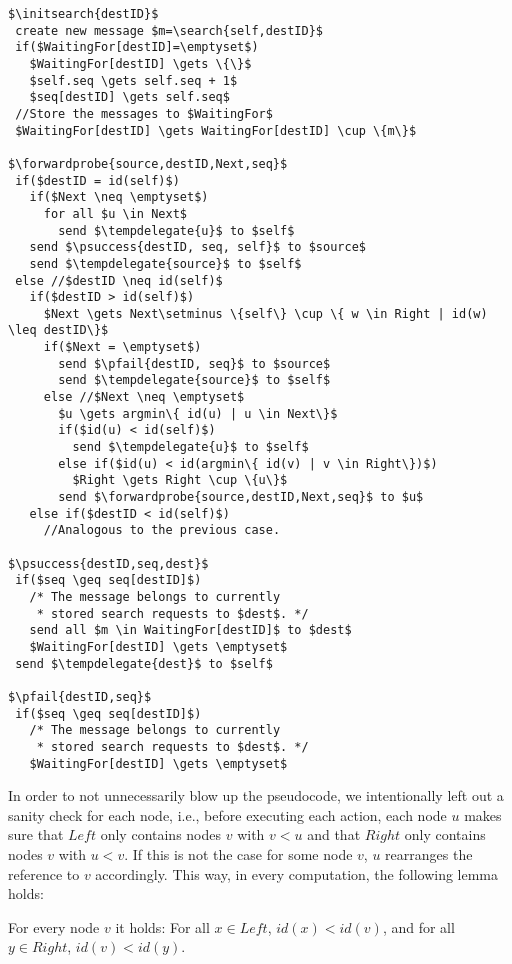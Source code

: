 \documentclass[a4paper,USenglish]{lipics}
\newcommand{\srp}{\textsc{Search+}\xspace}
\newcommand{\tempdelegate}[1]{\textsc{TempDelegate(\ensuremath{#1})}\xspace}
\newcommand{\search}[1]{\textsc{Search(\ensuremath{#1})}\xspace}
\newcommand{\initsearch}[1]{\textsc{InitiateNewSearch(\ensuremath{#1})}\xspace}
\newcommand{\forwardprobe}[1]{\textsc{ForwardProbe(\ensuremath{#1})}\xspace}
\newcommand{\psuccess}[1]{\textsc{ProbeSuccess(\ensuremath{#1})}\xspace}
\newcommand{\pfail}[1]{\textsc{ProbeFail(\ensuremath{#1})}\xspace}
\begin{document}
\begin{lstlisting}[mathescape=true,float,caption=\srp protocol,label=algo:search]
$\initsearch{destID}$
 create new message $m=\search{self,destID}$
 if($WaitingFor[destID]=\emptyset$)
   $WaitingFor[destID] \gets \{\}$
   $self.seq \gets self.seq + 1$
   $seq[destID] \gets self.seq$
 //Store the messages to $WaitingFor$ 
 $WaitingFor[destID] \gets WaitingFor[destID] \cup \{m\}$ 

$\forwardprobe{source,destID,Next,seq}$
 if($destID = id(self)$)
   if($Next \neq \emptyset$)
     for all $u \in Next$
       send $\tempdelegate{u}$ to $self$
   send $\psuccess{destID, seq, self}$ to $source$
   send $\tempdelegate{source}$ to $self$
 else //$destID \neq id(self)$
   if($destID > id(self)$)
     $Next \gets Next\setminus \{self\} \cup \{ w \in Right | id(w) \leq destID\}$
     if($Next = \emptyset$)
       send $\pfail{destID, seq}$ to $source$
       send $\tempdelegate{source}$ to $self$
     else //$Next \neq \emptyset$
       $u \gets argmin\{ id(u) | u \in Next\}$
       if($id(u) < id(self)$)
         send $\tempdelegate{u}$ to $self$
       else if($id(u) < id(argmin\{ id(v) | v \in Right\})$)
         $Right \gets Right \cup \{u\}$
       send $\forwardprobe{source,destID,Next,seq}$ to $u$
   else if($destID < id(self)$) 
     //Analogous to the previous case.
 
$\psuccess{destID,seq,dest}$
 if($seq \geq seq[destID]$)
   /* The message belongs to currently  
    * stored search requests to $dest$. */
   send all $m \in WaitingFor[destID]$ to $dest$
   $WaitingFor[destID] \gets \emptyset$
 send $\tempdelegate{dest}$ to $self$
 
$\pfail{destID,seq}$
 if($seq \geq seq[destID]$)
   /* The message belongs to currently  
    * stored search requests to $dest$. */
   $WaitingFor[destID] \gets \emptyset$
\end{lstlisting}


In order to not unnecessarily blow up the pseudocode, we intentionally left out a sanity check for each node, i.e., before executing each action, each node $u$ makes sure that $Left$ only contains nodes $v$ with $v < u$ and that $Right$ only contains nodes $v$ with $u < v$.
If this is not the case for some node $v$, $u$ rearranges the reference to $v$ accordingly.
This way, in every computation, the following lemma holds:

\begin{lemma}\label{lem:left_and_right_are_what_they_say}
  For every node $v$ it holds: For all $x \in Left$, $id(x) < id(v)$, and for all $y \in Right$, $id(v)<id(y)$.
\end{lemma}
\end{document}
